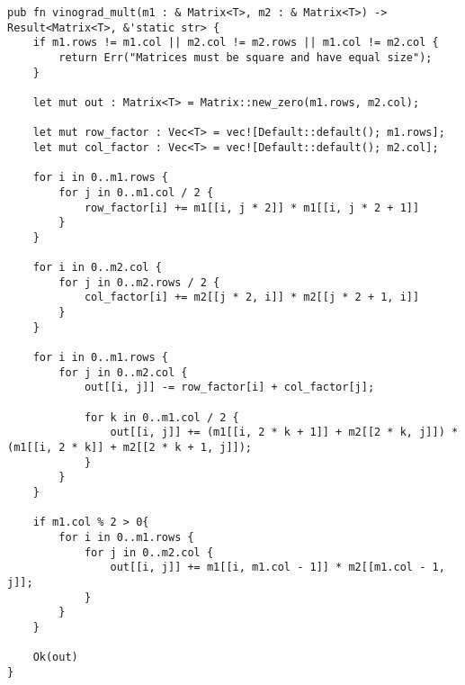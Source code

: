 \begin{lstlisting}[caption=Алгоритм умножения матриц Винограда, label=list:vinograd, language={}]
pub fn vinograd_mult(m1 : & Matrix<T>, m2 : & Matrix<T>) -> Result<Matrix<T>, &'static str> {
    if m1.rows != m1.col || m2.col != m2.rows || m1.col != m2.col {
        return Err("Matrices must be square and have equal size");
    }

    let mut out : Matrix<T> = Matrix::new_zero(m1.rows, m2.col);

    let mut row_factor : Vec<T> = vec![Default::default(); m1.rows];
    let mut col_factor : Vec<T> = vec![Default::default(); m2.col];

    for i in 0..m1.rows {
        for j in 0..m1.col / 2 {
            row_factor[i] += m1[[i, j * 2]] * m1[[i, j * 2 + 1]]
        }
    }

    for i in 0..m2.col {
        for j in 0..m2.rows / 2 {
            col_factor[i] += m2[[j * 2, i]] * m2[[j * 2 + 1, i]]
        }
    }

    for i in 0..m1.rows {
        for j in 0..m2.col {
            out[[i, j]] -= row_factor[i] + col_factor[j];

            for k in 0..m1.col / 2 {
                out[[i, j]] += (m1[[i, 2 * k + 1]] + m2[[2 * k, j]]) * (m1[[i, 2 * k]] + m2[[2 * k + 1, j]]);
            }
        }
    }

    if m1.col % 2 > 0{
        for i in 0..m1.rows {
            for j in 0..m2.col {
                out[[i, j]] += m1[[i, m1.col - 1]] * m2[[m1.col - 1, j]];
            }
        }
    }

    Ok(out)
}
\end{lstlisting}


